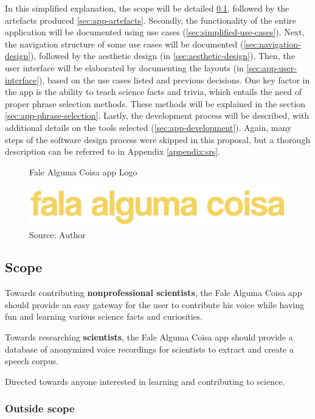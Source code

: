 In this simplified explanation, the scope will be detailed \ref{sec:app-scope}, followed by the artefacts produced \ref{sec:app-artefacts}. Secondly, the functionality of the entire application will be documented using use cases (\ref{sec:simplified-use-cases}). Next, the navigation structure of some use cases will be documented (\ref{sec:navigation-design}), followed by the aesthetic design (in \ref{sec:aesthetic-design}). Then, the user interface will be elaborated by documenting the layouts (in \ref{sec:app-user-interface}), based on the use cases listed and previous decisions. One key factor in the app is the ability to teach science facts and trivia, which entails the need of proper phrase selection methods. These methods will be explained in the section \ref{sec:app-phrase-selection}. Lastly, the development process will be described, with additional details on the tools selected (\ref{sec:app-development}). Again, many steps of the software design process were skipped in this proposal, but a thorough description can be referred to in Appendix \ref{appendix:srs}.

\begin{figure}[ht]
    \centering
    \caption{Fale Alguma Coisa app Logo}
     \includegraphics[width=\linewidth/2]{images/app/logo.jpg}
    \caption*{Source: Author}
    \label{fig:falealgumacoisa-logo}
\end{figure}

\subsection{Scope}
\label{sec:app-scope}

Towards contributing \textbf{nonprofessional scientists}, the Fale Alguma Coisa app should provide an easy gateway for the user to contribute his voice while having fun and learning various science facts and curiosities.

Towards researching \textbf{scientists}, the Fale Alguma Coisa app should provide a database of anonymized voice recordings for scientists to extract and create a speech corpus.

Directed towards anyone interested in learning and contributing to science.

\subsubsection{Outside scope}

